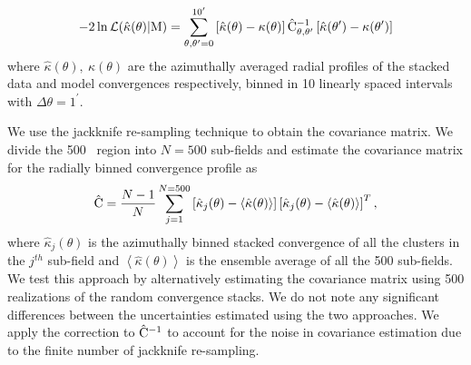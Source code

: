 \begin{equation}
-2\ln\mathcal{L (\hat{\kappa}(\theta)| \rm{M}}) = 
\sum_{\theta, \theta^{\prime} = 0}^{10^{\prime}}\left[\hat{\kappa}(\theta) - \kappa(\theta)\right] \hat{{\rm C}}_{\theta, \theta^{\prime}}^{-1} \left[\hat{\kappa}(\theta^{\prime}) - \kappa(\theta^{\prime})\right]
\label{eq_QE_likelihood}
\end{equation}
where $\hat{\kappa}(\theta),\ \kappa(\theta)$ are the azimuthally averaged radial profiles of the stacked data and model convergences respectively, binned in 10 linearly spaced intervals with $\Delta\theta = 1^{\prime}$. %


We use the jackknife re-sampling technique to obtain the covariance matrix. We divide the \sptpol{} 500 \sqdeg\ region into $N=500$ sub-fields and estimate the covariance matrix for the radially binned convergence profile as 
\begin{equation}
\hat{{\rm C}} = \frac{N-1}{N} \sum\limits_{j=1}^{N = 500} \left[\hat{\kappa}_{j}(\theta) - \left<\hat{\kappa}(\theta)\right>\right] \left[\hat{\kappa}_{j}(\theta) - \left<\hat{\kappa}(\theta)\right>\right]^{T},
\label{eq_JK_cov}
\end{equation}
where $\hat{\kappa}_{j}(\theta)$ is the azimuthally binned stacked convergence of all the clusters in the $j^{th}$ sub-field and  $\left<\hat{\kappa}(\theta)\right>$ is the ensemble average of all the 500 sub-fields.
We test this approach by alternatively estimating the covariance matrix using 500 realizations of the random convergence stacks. 
We do not note any significant differences between the uncertainties estimated using the two approaches. 
We apply the \citet{hartlap06} correction to $\hat{{\rm C}}^{-1}$ to account for the noise in covariance estimation due to the finite number of jackknife re-sampling.


